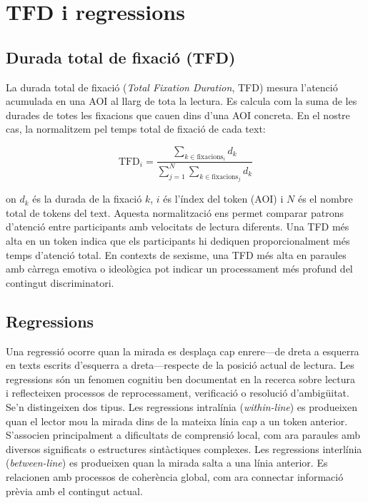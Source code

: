 \chapter{TFD i regressions}\label{app:tfd}

\section{Durada total de fixació (TFD)}

La durada total de fixació (\textit{Total Fixation Duration}, TFD) mesura l'atenció acumulada en una AOI al llarg de tota la lectura.
Es calcula com la suma de les durades de totes les fixacions que cauen dins d'una AOI concreta.
En el nostre cas, la normalitzem pel temps total de fixació de cada text:

\[
\text{TFD}_{i} = \frac{\sum_{k \in \text{fixacions}_i} d_k}{\sum_{j=1}^{N} \sum_{k \in \text{fixacions}_j} d_k}
\]

on $d_k$ és la durada de la fixació $k$, $i$ és l'índex del token (AOI) i $N$ és el nombre total de tokens del text.
Aquesta normalització ens permet comparar patrons d'atenció entre participants amb velocitats de lectura diferents.
Una TFD més alta en un token indica que els participants hi dediquen proporcionalment més temps d'atenció total.
En contexts de sexisme, una TFD més alta en paraules amb càrrega emotiva o ideològica pot indicar un processament més profund del contingut discriminatori.

\section{Regressions}

Una regressió ocorre quan la mirada es desplaça cap enrere---de dreta a esquerra en texts escrits d'esquerra a dreta---respecte de la posició actual de lectura.
Les regressions són un fenomen cognitiu ben documentat en la recerca sobre lectura~\cite{rayner1998eye, rayner2009eye} i reflecteixen processos de reprocessament, verificació o resolució d'ambigüitat.
Se'n distingeixen dos tipus.
Les regressions intralínia (\textit{within-line}) es produeixen quan el lector mou la mirada dins de la mateixa línia cap a un token anterior. S'associen principalment a dificultats de comprensió local, com ara paraules amb diversos significats o estructures sintàctiques complexes.
Les regressions interlínia (\textit{between-line}) es produeixen quan la mirada salta a una línia anterior. Es relacionen amb processos de coherència global, com ara connectar informació prèvia amb el contingut actual.

